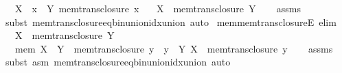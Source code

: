\begin{isabellebody}
\ \ \ {\isachardoublequoteopen}X\ {\isasymin}\ {\isacharparenleft}{\kern0pt}{\isasymUnion}x\ {\isasymin}\ Y{\isachardot}{\kern0pt}\ mem{\isacharunderscore}{\kern0pt}trans{\isacharunderscore}{\kern0pt}closure\ x{\isacharparenright}{\kern0pt}{\isachardoublequoteclose}\isanewline
\ \ \ {\isachardoublequoteopen}X\ {\isasymin}\ mem{\isacharunderscore}{\kern0pt}trans{\isacharunderscore}{\kern0pt}closure\ Y{\isachardoublequoteclose}\isanewline
%
\isadelimproof
\ \ %
\endisadelimproof
%
\isatagproof
{}\isamarkupfalse%
\ assms\ \isamarkupfalse%
\ {\isacharparenleft}{\kern0pt}subst\ mem{\isacharunderscore}{\kern0pt}trans{\isacharunderscore}{\kern0pt}closure{\isacharunderscore}{\kern0pt}eq{\isacharunderscore}{\kern0pt}bin{\isacharunderscore}{\kern0pt}union{\isacharunderscore}{\kern0pt}idx{\isacharunderscore}{\kern0pt}union{\isacharparenright}{\kern0pt}\ auto%
\endisatagproof
{\isafoldproof}%
%
\isadelimproof
\isanewline
%
\endisadelimproof
\isanewline
{}\isamarkupfalse%
\ mem{\isacharunderscore}{\kern0pt}mem{\isacharunderscore}{\kern0pt}trans{\isacharunderscore}{\kern0pt}closureE\ {\isacharbrackleft}{\kern0pt}elim{\isacharbrackright}{\kern0pt}{\isacharcolon}{\kern0pt}\isanewline
\ \ \ {\isachardoublequoteopen}X\ {\isasymin}\ mem{\isacharunderscore}{\kern0pt}trans{\isacharunderscore}{\kern0pt}closure\ Y{\isachardoublequoteclose}\isanewline
\ \ \ {\isacharparenleft}{\kern0pt}mem{\isacharparenright}{\kern0pt}\ {\isachardoublequoteopen}X\ {\isasymin}\ Y{\isachardoublequoteclose}\ {\isacharbar}{\kern0pt}\ {\isacharparenleft}{\kern0pt}mem{\isacharunderscore}{\kern0pt}trans{\isacharunderscore}{\kern0pt}closure{\isacharparenright}{\kern0pt}\ y\ \ {\isachardoublequoteopen}y\ {\isasymin}\ Y{\isachardoublequoteclose}\ {\isachardoublequoteopen}X\ {\isasymin}\ mem{\isacharunderscore}{\kern0pt}trans{\isacharunderscore}{\kern0pt}closure\ y{\isachardoublequoteclose}\isanewline
%
\isadelimproof
\ \ %
\endisadelimproof
%
\isatagproof
{}\isamarkupfalse%
\ assms\ \isamarkupfalse%
\ {\isacharparenleft}{\kern0pt}subst\ {\isacharparenleft}{\kern0pt}asm{\isacharparenright}{\kern0pt}\ mem{\isacharunderscore}{\kern0pt}trans{\isacharunderscore}{\kern0pt}closure{\isacharunderscore}{\kern0pt}eq{\isacharunderscore}{\kern0pt}bin{\isacharunderscore}{\kern0pt}union{\isacharunderscore}{\kern0pt}idx{\isacharunderscore}{\kern0pt}union{\isacharparenright}{\kern0pt}\ auto%
\endisatagproof
{\isafoldproof}%
%
\isadelimproof
\isanewline

\end{isabellebody}

